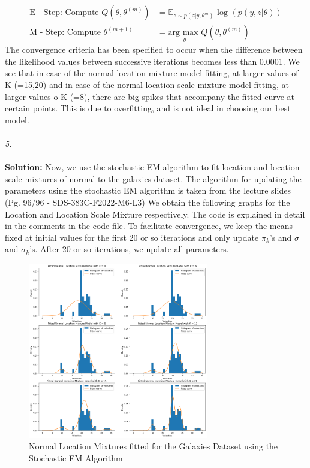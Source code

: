 \documentclass[11pt]{article}
\begin{document}
\begin{equation}
  \nonumber
  \begin{aligned}
    \text{E - Step: Compute } Q(\theta, \theta^{(m)}) & = \mathbb{E}_{z \sim p(z | y, \theta^{m})}\text{ log }(p(y, z | \theta))\\
    \text{M - Step: Compute } \theta^{(m+1)} & = \underset{\theta}{\text{arg max }} Q(\theta, \theta^{(m)})
  \end{aligned}
\end{equation}
The convergence criteria has been specified to occur when the difference between the likelihood values between successive iterations becomes less than 0.0001. We see that in case of the normal location mixture model fitting, at larger values of K (=15,20) and in case of the normal location scale mixture model fitting, at larger values o K (=8), there are big spikes that accompany the fitted curve at certain points. This is due to overfitting, and is not ideal in choosing our best model. \\ \\
\emph{5.}\\ \\
\textbf{Solution: }
Now, we use the stochastic EM algorithm to fit location and location scale mixtures of normal to the galaxies dataset. The algorithm for updating the parameters using the stochastic EM algorithm is taken from the lecture slides (Pg. 96/96 - SDS-383C-F2022-M6-L3)
We obtain the following graphs for the Location and Location Scale Mixture respectively. The code is explained in detail in the comments in the code file. To facilitate convergence, we keep the means fixed at initial values for the first 20 or so iterations and only update $\pi_{k}$'s and $\sigma$ and $\sigma_{k}$'s. After 20 or so iterations, we update all parameters.
\begin{figure}[H]
  \centering
  \includegraphics[width = 0.7\textwidth]{output5a.png}
  \caption{Normal Location Mixtures fitted for the Galaxies Dataset using the Stochastic EM Algorithm}
\end{figure}
\end{document}
